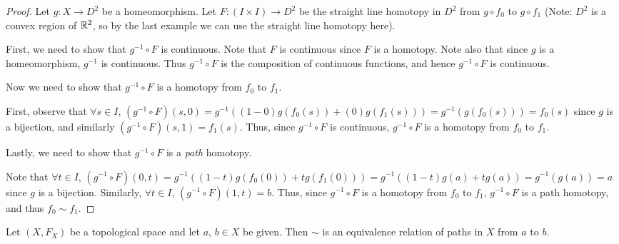 \begin{proof}
	Let $g: X \rightarrow D^2$ be a homeomorphism. Let $F: (I \times I) \rightarrow D^2$ be the straight line homotopy in $D^2$ from $g \circ f_0$ to $g \circ f_1$ (Note: $D^2$ is a convex region of $\mathbb R^2$, so by the last example we can use the straight line homotopy here).
	
	First, we need to show that $g^{-1} \circ F$ is continuous. Note that $F$ is continuous since $F$ is a homotopy. Note also that since $g$ is a homeomorphism, $g^{-1}$ is continuous. Thus $g^{-1} \circ F$ is the composition of continuous functions, and hence $g^{-1} \circ F$ is continuous.
	
	Now we need to show that $g^{-1} \circ F$ is a homotopy from $f_0$ to $f_1$.
	
	First, observe that $\forall s \in I$, $(g^{-1} \circ F)(s,0) = g^{-1}((1-0)g(f_0(s)) + (0)g(f_1(s))) = g^{-1}(g(f_0(s))) = f_0(s)$ since $g$ is a bijection, and similarly $(g^{-1} \circ F)(s, 1) = f_1(s)$. Thus, since $g^{-1} \circ F$ is continuous, $g^{-1} \circ F$ is a homotopy from $f_0$ to $f_1$.
	
	Lastly, we need to show that $g^{-1} \circ F$ is a \emph{path} homotopy.
	
	Note that $\forall t \in I$, $(g^{-1} \circ F)(0, t) = g^{-1}((1-t)g(f_0(0)) + tg(f_1(0))) = g^{-1}((1-t)g(a) + tg(a)) = g^{-1}(g(a)) = a$ since $g$ is a bijection. Similarly, $\forall t \in I$, $(g^{-1} \circ F)(1,t) = b$. Thus, since $g^{-1} \circ F$ is a homotopy from $f_0$ to $f_1$, $g^{-1} \circ F$ is a path homotopy, and thus $f_0 \sim f_1$. 
\end{proof}
\begin{theorem}
	Let $(X, F_X)$ be a topological space and let $a$, $b \in X$ be given. Then $\sim$ is an equivalence relation of paths in $X$ from $a$ to $b$. 
\end{theorem}
